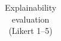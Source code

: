 \begin{table}[t]
\centering
\caption{Explainability evaluation (Likert 1–5)}
\label{tab:table6_explainability}
\begin{tabular}{l}
\toprule
 \\
\midrule
\bottomrule
\end{tabular}
\end{table}
